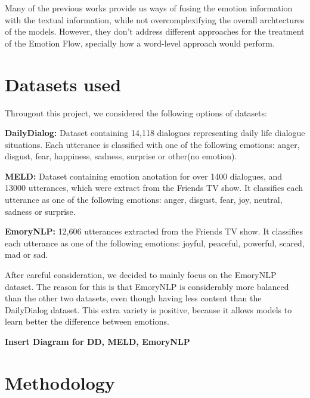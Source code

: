 \documentclass[oneside, a4paper, onecolumn, 11pt]{article}
\begin{document}
Many of the previous works provide us ways of fusing the emotion information with the textual information, while not overcomplexifying the overall 
archtectures of the models. However, they don't address different approaches for the treatment of the Emotion Flow, specially how a word-level approach
would perform.




\section{Datasets used}

Througout this project, we considered the following options of datasets:

\textbf{DailyDialog: } \cite{li2017dailydialogmanuallylabelledmultiturn} Dataset containing 14,118 dialogues representing daily life dialogue situations. Each 
utterance is classified with one of the following emotions: anger, disgust, fear, happiness, sadness, surprise or other(no emotion).

\textbf{MELD: } \cite{poria2019meldmultimodalmultipartydataset} Dataset containing emotion anotation for over 1400 dialogues, and 13000 utterances, which were extract
from the Friends TV show. It classifies each utterance as one of the following emotions: anger, disgust, fear, joy, neutral, sadness or surprise.

\textbf{EmoryNLP: } \cite{zahiri2017emotiondetectiontvtranscripts} 12,606 utterances extracted from the Friends TV show. It classifies each utterance as one of the following
emotions: joyful, peaceful, powerful, scared, mad or sad.

After careful consideration, we decided to mainly focus on the EmoryNLP dataset. The reason for this is that EmoryNLP is considerably more balanced than the other two 
datasets, even though having less content than the DailyDialog dataset. This extra variety is positive, because it allows models to learn better the difference between
emotions.

\textbf{Insert Diagram for DD, MELD, EmoryNLP}

\section{Methodology}
\end{document}
